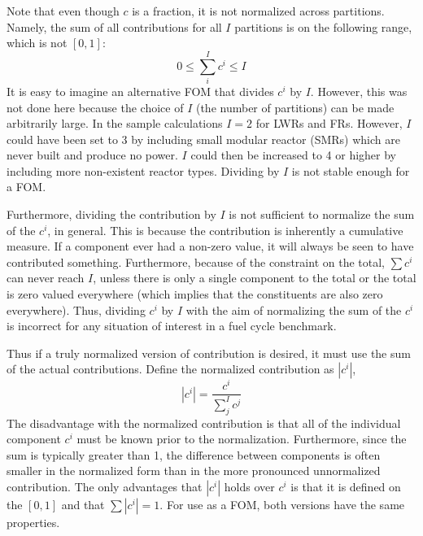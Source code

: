 Note that even though $c$ is a fraction, it is not normalized across 
partitions. Namely, the sum of all contributions for all $I$ partitions
is on the following range, which is not $[0, 1]$:
\begin{equation}
\label{sum-c-range}
0 \le \sum_i^I c^i \le I
\end{equation}
It is easy to imagine an alternative FOM that divides $c^i$ by $I$. However, 
this was not done here because the choice of $I$ (the number of partitions)
can be made arbitrarily large.  In the sample calculations $I=2$ for LWRs and
FRs.  However, $I$ could have been set to 3 by including small modular reactor
(SMRs) which are never built and produce no power.  $I$ could then be 
increased to 4 or higher by including more non-existent reactor types.
Dividing by $I$ is not stable enough for a FOM.

Furthermore, dividing the contribution by $I$ is not sufficient to 
normalize the sum of the $c^i$, in general.  This is because the 
contribution is inherently a cumulative measure. If a component ever had a 
non-zero value, it will always be seen to have contributed something. 
Furthermore, because of the constraint on the total, $\sum c^i$ can never
reach $I$, unless there is only a single component to the total or the 
total is zero valued everywhere (which implies that the constituents are also 
zero everywhere). Thus, dividing $c^i$ by $I$ with the aim of normalizing the 
sum of the $c^i$ is incorrect for any situation of interest in a fuel 
cycle benchmark.

Thus if a truly normalized version of contribution is desired, it must 
use the sum of the actual contributions. Define the normalized contribution 
as $|c^i|$, 
\begin{equation}
\label{norm-ci}
\left|c^i\right| = \frac{c^i}{\sum_j^I c^j}
\end{equation}
The disadvantage with the normalized contribution is that all of the 
individual component $c^i$ must be known prior to the normalization. 
Furthermore, since the sum is typically greater than 1, the difference 
between components is often smaller in the normalized form than in the
more pronounced unnormalized contribution.
The only advantages that $|c^i|$ holds over $c^i$ is that it is defined on 
the $[0,1]$ and that $\sum |c^i| = 1$. For use as a FOM, both versions
have the same properties.

